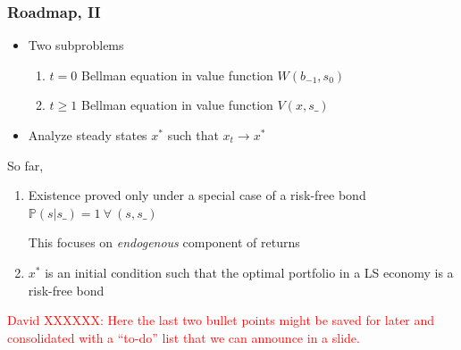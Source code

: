 \documentclass{beamer}
\begin{document}
\begin{frame}
\frametitle{Roadmap, II}
\begin{itemize}

\item Two subproblems
\begin{enumerate}
 \item  $t=0$ Bellman equation in value function $W(b_{-1},s_0)$ %
 \item  $t\geq 1$ Bellman equation in value function $V(x,s\_)$
\end{enumerate}

\item Analyze steady states $x^*$ such that $x_t \to x^*$

\end{itemize}
So far,
\begin{enumerate}
 \item  Existence proved only under a special case of a risk-free bond  $\mathbb{P}(s|s\_)=1 \ \forall \ (s,s\_)$

 This focuses on \textit{endogenous} component of returns

 \item   $x^*$  is an initial condition such that the optimal portfolio in a LS economy is a risk-free bond

\end{enumerate}

\textcolor{red}{David XXXXXX: Here the last two bullet points might be saved for later and consolidated with a ``to-do'' list that
we can announce in a slide.}
\end{frame}
\end{document}
